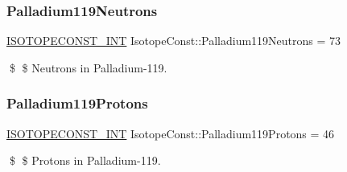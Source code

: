 \subsubsection{\texorpdfstring{Palladium119\+Neutrons}{Palladium119Neutrons}}
{\footnotesize\ttfamily \mbox{\hyperlink{group___isotope_const-_macros_ga5f18360b3e99483a35c32d789e62621c}{I\+S\+O\+T\+O\+P\+E\+C\+O\+N\+S\+T\+\_\+\+I\+NT}} Isotope\+Const\+::\+Palladium119\+Neutrons = 73}

\$ \$ Neutrons in Palladium-\/119. \mbox{\label{group___isotope_const-_palladium-_pd119_gaace87b8323b41ea2abd83522d9729a9e}} 
\subsubsection{\texorpdfstring{Palladium119\+Protons}{Palladium119Protons}}
{\footnotesize\ttfamily \mbox{\hyperlink{group___isotope_const-_macros_ga5f18360b3e99483a35c32d789e62621c}{I\+S\+O\+T\+O\+P\+E\+C\+O\+N\+S\+T\+\_\+\+I\+NT}} Isotope\+Const\+::\+Palladium119\+Protons = 46}

\$ \$ Protons in Palladium-\/119. 